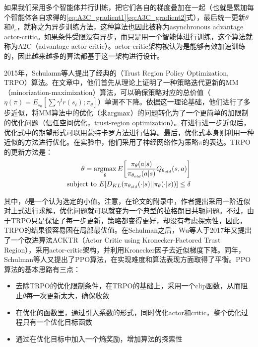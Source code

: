       \par 如果我们采用多个智能体并行训练，把它们各自的梯度叠加在一起（也就是累加每个智能体各自求得的\eqref{eq:A3C_gradient1}\eqref{eq:A3C_gradient2}式），最后统一更新$\theta$和$\theta_v$，就称之为异步训练方法，这种算法也因此被称为asynchronous advantage actor-critic。如果条件受限没有异步，而只是用一个智能体进行训练，这个算法就称为A2C（advantage actor-critic）。actor-critic架构被认为是能够有效加速训练的，因此越来越多的算法都基于这一架构进行设计。\par
      2015年，Schulamn等人提出了经典的（Trust Region Policy Optimization, TRPO）算法\cite{TRPO}。在文章中，他们首先从理论上证明了一种策略迭代更新的MM（minorization-maximization）算法，可以确保策略对应的总价值（$\eta(\pi) = E_{s_0}[\sum \gamma^t r(s_t); \pi_\theta]$）单调不下降。依据这一理论基础，他们进行了多步近似，将MM算法中的优化（求$\operatorname*{argmax}$）的问题转化为了一个更简单的加限制的优化问题（信任空间优化，trust-region optimization）。在进行进一步近似后，优化式中的期望形式可以用蒙特卡罗方法进行估算。最后，优化式本身则利用一种近似的方法进行优化。在实验中，他们采用了神经网络作为策略$\pi$的表达。TRPO的更新方法是：
      \begin{align}
        \begin{aligned}
          \theta = \operatorname*{argmax}_\theta E\bigg[\frac{\pi_\theta(a|s)}{\pi_{\theta_{old}}(a|s)}Q_{\theta_{old}}(s, a)\bigg]\\
          \text{subject to } E[D_{KL}(\pi_{\theta_{old}}(\cdot|s)||\pi_\theta(\cdot|s))] \leq \delta
        \end{aligned}
      \end{align}
      \par 其中，$\delta$是一个认为选定的小值。注意，在论文的附录中，作者提出采用一阶近似对上式进行求解，优化问题就可以就变为一个典型的拉格朗日共轭问题\cite{Convex_optimization_book}。不过，由于TRPO只是保证了每一步更新，策略都变得更好，却没有考虑探索性，因此，TRPO的结果很容易困在局部最优值。在Schulman之后，Wu等人于2017年又提出了一个改进算法ACKTR\cite{ACKTR}（Actor Critic using Kronecker-Factored Trust Region），采用actor-critic架构，并利用Kronecker因子去近似梯度下降。同年，Schulman等人又提出了PPO算法\cite{PPO}，在实现难度和算法表现方面取得了平衡。PPO算法的基本思路有三点：
      \begin{itemize}
        \item 去除TRPO的优化限制条件，在TRPO的基础上，采用一个clip函数，从而阻止$\theta$每一次更新太大，确保收敛
        \item 在优化的函数里，通过引入系数的形式，同时优化actor和critic，整个优化过程只有一个优化目标函数
        \item 通过在优化目标中加入一个熵奖励，增加算法的探索性
      \end{itemize}
